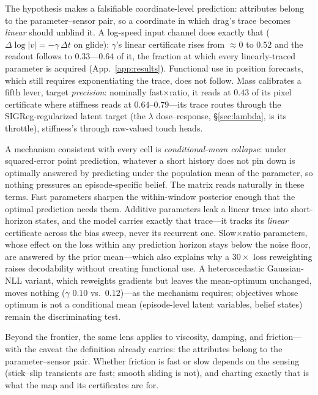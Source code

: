 \documentclass{article} %
\begin{document}
The hypothesis makes a falsifiable coordinate-level prediction: attributes
belong to the parameter--sensor pair, so a coordinate in which drag's trace
becomes \emph{linear} should unblind it. A log-speed input channel does
exactly that ($\Delta \log |v| = -\gamma\,\Delta t$ on glide): $\gamma$'s
linear certificate rises from ${\approx}0$ to $0.52$ and the readout
follows to $0.33$---$0.64$ of it, the fraction at which every
linearly-traced parameter is acquired (App.~\ref{app:results}).
Functional use in position
forecasts, which still requires exponentiating the trace, does not follow.
Mass calibrates a fifth lever, target \emph{precision}: nominally
fast$\times$ratio, it reads at $0.43$ of its pixel certificate where
stiffness reads at $0.64$--$0.79$---its trace routes through the
SIGReg-regularized latent target (the $\lambda$ dose--response,
\S\ref{sec:lambda}, is its throttle), stiffness's through raw-valued touch
heads.

A mechanism consistent with every cell is \emph{conditional-mean collapse}:
under squared-error point prediction, whatever a short history does not pin
down is optimally answered by predicting under the population mean of the
parameter, so nothing pressures an episode-specific belief. The matrix reads
naturally in these terms. Fast parameters sharpen the within-window
posterior enough that the optimal prediction needs them. Additive parameters
leak a linear trace into short-horizon states, and the model carries exactly
that trace---it tracks its \emph{linear} certificate across the bias sweep,
never its recurrent one. Slow$\times$ratio parameters, whose effect on the
loss within any prediction horizon stays below the noise floor, are answered
by the prior mean---which also explains why a $30\times$ loss reweighting
raises decodability without creating functional use. A heteroscedastic
Gaussian-NLL variant, which reweights gradients but leaves the mean-optimum
unchanged, moves nothing ($\gamma$ $0.10$ vs.\ $0.12$)---as the mechanism
requires; objectives whose optimum is not a conditional mean (episode-level
latent variables, belief states) remain the discriminating test.

Beyond the frontier, the same lens applies to viscosity, damping, and
friction---with the caveat the definition already carries: the attributes
belong to the parameter--sensor pair. Whether friction is fast or slow
depends on the sensing (stick--slip transients are fast; smooth sliding is
not), and charting exactly that is what the map and its certificates are
for.
\end{document}
